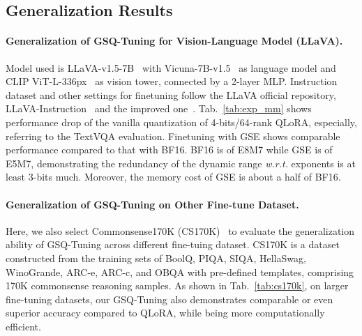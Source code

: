 \vspace{-3mm}
\subsection{Generalization Results}\label{subsec_generalization}
\paragraph{Generalization of GSQ-Tuning for Vision-Language Model (LLaVA).}
Model used is LLaVA-v1.5-7B~\citep{liu2024improved} with Vicuna-7B-v1.5~\citep{zheng2023judging} as language model and CLIP ViT-L-336px~\citep{radford2021learning} as vision tower, connected by a 2-layer MLP. Instruction dataset and other settings for finetuning follow the LLaVA official repository, LLaVA-Instruction~\citep{liu2024visual} and the improved one~\citep{liu2024improved}.
Tab.~\ref{tab:exp_mm} shows performance drop of the vanilla quantization of 4-bits/64-rank QLoRA, especially, referring to the TextVQA evaluation. Finetuning with GSE shows comparable performance compared to that with BF16. BF16 is of E8M7 while GSE is of E5M7, demonstrating the redundancy of the dynamic range \textit{w.r.t.} exponents is at least 3-bits much. Moreover, the memory cost of GSE is about a half of BF16.

\paragraph{Generalization of GSQ-Tuning on Other Fine-tune Dataset.} Here, we also select Commonsense170K (CS170K)~\citep{hu2023llmadapters} to evaluate the generalization ability of GSQ-Tuning across different fine-tuing dataset. CS170K is a dataset constructed from the training sets of BoolQ, PIQA, SIQA, HellaSwag, WinoGrande, ARC-e, ARC-c, and OBQA with pre-defined templates, comprising 170K commonsense reasoning samples. As shown in Tab.~\ref{tab:cs170k}, on larger fine-tuning datasets, our GSQ-Tuning also demonstrates comparable or even superior accuracy compared to QLoRA, while being more computationally efficient. 


\vspace{-3mm}
